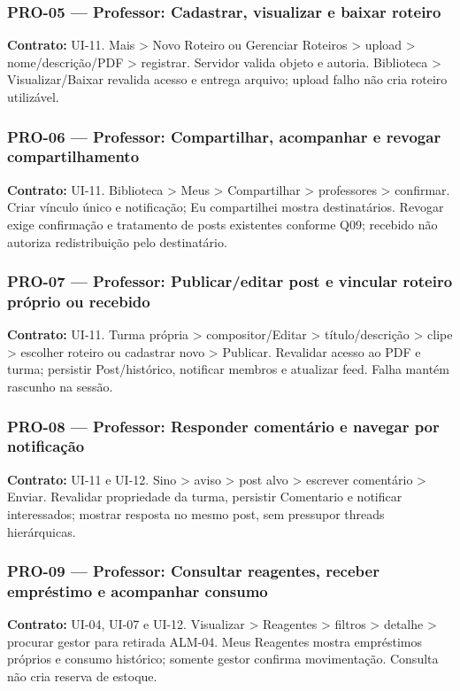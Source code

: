 \subsubsection{PRO-05 --- Professor: Cadastrar, visualizar e baixar roteiro}
\textbf{Contrato:} UI-11. Mais > Novo Roteiro ou Gerenciar Roteiros > upload > nome/descrição/PDF > registrar. Servidor valida objeto e autoria. Biblioteca > Visualizar/Baixar revalida acesso e entrega arquivo; upload falho não cria roteiro utilizável.

\subsubsection{PRO-06 --- Professor: Compartilhar, acompanhar e revogar compartilhamento}
\textbf{Contrato:} UI-11. Biblioteca > Meus > Compartilhar > professores > confirmar. Criar vínculo único e notificação; Eu compartilhei mostra destinatários. Revogar exige confirmação e tratamento de posts existentes conforme Q09; recebido não autoriza redistribuição pelo destinatário.

\subsubsection{PRO-07 --- Professor: Publicar/editar post e vincular roteiro próprio ou recebido}
\textbf{Contrato:} UI-11. Turma própria > compositor/Editar > título/descrição > clipe > escolher roteiro ou cadastrar novo > Publicar. Revalidar acesso ao PDF e turma; persistir Post/histórico, notificar membros e atualizar feed. Falha mantém rascunho na sessão.

\subsubsection{PRO-08 --- Professor: Responder comentário e navegar por notificação}
\textbf{Contrato:} UI-11 e UI-12. Sino > aviso > post alvo > escrever comentário > Enviar. Revalidar propriedade da turma, persistir Comentario e notificar interessados; mostrar resposta no mesmo post, sem pressupor threads hierárquicas.

\subsubsection{PRO-09 --- Professor: Consultar reagentes, receber empréstimo e acompanhar consumo}
\textbf{Contrato:} UI-04, UI-07 e UI-12. Visualizar > Reagentes > filtros > detalhe > procurar gestor para retirada ALM-04. Meus Reagentes mostra empréstimos próprios e consumo histórico; somente gestor confirma movimentação. Consulta não cria reserva de estoque.

